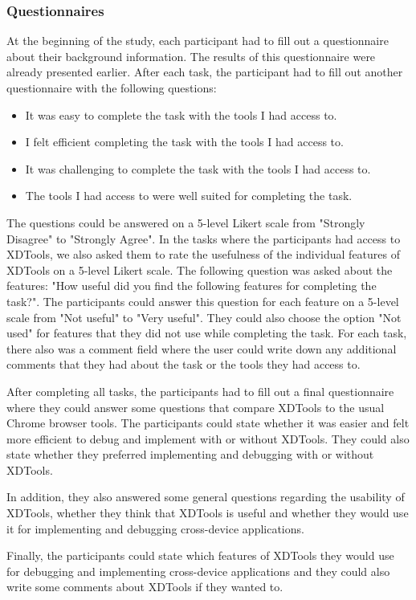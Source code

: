 \subsubsection{Questionnaires}
At the beginning of the study, each participant had to fill out a questionnaire about their background information. The results of this questionnaire were already presented earlier. After each task, the participant had to fill out another questionnaire with the following questions:
\begin{itemize}
	\item It was easy to complete the task with the tools I had access to.
	\item I felt efficient completing the task with the tools I had access to.
	\item It was challenging to complete the task with the tools I had access to.
	\item The tools I had access to were well suited for completing the task.
\end{itemize}
The questions could be answered on a 5-level Likert scale from "Strongly Disagree" to "Strongly Agree". In the tasks where the participants had access to XDTools, we also asked them to rate the usefulness of the individual features of XDTools on a 5-level Likert scale. The following question was asked about the features: "How useful did you find the following features for completing the task?". The participants could answer this question for each feature on a 5-level scale from "Not useful" to "Very useful". They could also choose the option "Not used" for features that they did not use while completing the task. For each task, there also was a comment field where the user could write down any additional comments that they had about the task or the tools they had access to.

After completing all tasks, the participants had to fill out a final questionnaire where they could answer some questions that compare XDTools to the usual Chrome browser tools. The participants could state whether it was easier and felt more efficient to debug and implement with or without XDTools. They could also state whether they preferred implementing and debugging with or without XDTools.

In addition, they also answered some general questions regarding the usability of XDTools, whether they think that XDTools is useful and whether they would use it for implementing and debugging cross-device applications. 

Finally, the participants could state which features of XDTools they would use for debugging and implementing cross-device applications and they could also write some comments about XDTools if they wanted to.

